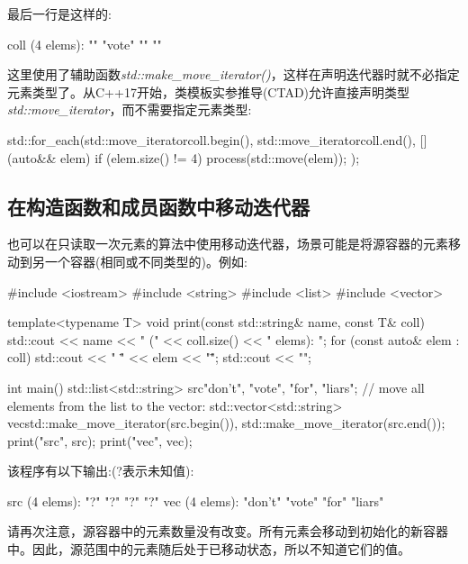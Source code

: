 最后一行是这样的:

\begin{outputcode}
coll (4 elems): "" "vote" "" ""
\end{outputcode}

这里使用了辅助函数\textit{std::make_move_iterator()}，这样在声明迭代器时就不必指定元素类型了。从C++17开始，类模板实参推导(CTAD)允许直接声明类型\textit{std::move_iterator}，而不需要指定元素类型:

\begin{cppcode}
std::for_each(std::move_iterator{coll.begin()},
std::move_iterator{coll.end()},
[] (auto&& elem) {
	if (elem.size() != 4) {
		process(std::move(elem));
	}
});
\end{cppcode}

\subsection{在构造函数和成员函数中移动迭代器}

也可以在只读取一次元素的算法中使用移动迭代器，场景可能是将源容器的元素移动到另一个容器(相同或不同类型的)。例如:

\begin{cppcode}
#include <iostream>
#include <string>
#include <list>
#include <vector>

template<typename T>
void print(const std::string& name, const T& coll)
{
	std::cout << name << " (" << coll.size() << " elems): ";
	for (const auto& elem : coll) {
		std::cout << " \"" << elem << "\"";
	}
	std::cout << "\n";
}

int main()
{
	std::list<std::string> src{"don't", "vote", "for", "liars"};
	// move all elements from the list to the vector:
	std::vector<std::string> vec{std::make_move_iterator(src.begin()),
		std::make_move_iterator(src.end())};
	print("src", src);
	print("vec", vec);
}
\end{cppcode}

该程序有以下输出:(?表示未知值):

\begin{outputcode}
src (4 elems): "?" "?" "?" "?"
vec (4 elems): "don't" "vote" "for" "liars"
\end{outputcode}

请再次注意，源容器中的元素数量没有改变。所有元素会移动到初始化的新容器中。因此，源范围中的元素随后处于已移动状态，所以不知道它们的值。













